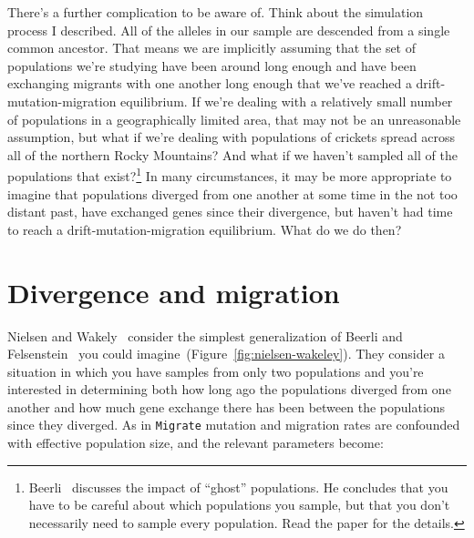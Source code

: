 There's a further complication to be aware of. Think about the
simulation process I described. All of the alleles in our sample are
descended from a single common ancestor. That means we are implicitly
assuming that the set of populations we're studying have been around
long enough and have been exchanging migrants with one another long
enough that we've reached a drift-mutation-migration equilibrium. If
we're dealing with a relatively small number of populations in a
geographically limited area, that may not be an unreasonable
assumption, but what if we're dealing with populations of crickets
spread across all of the northern Rocky Mountains? And what if we
haven't sampled all of the populations that
exist?\footnote{Beerli~\cite{Beerli-2004} discusses the impact of
  ``ghost'' populations. He concludes that you have to be careful
  about which populations you sample, but that you don't necessarily
  need to sample every population. Read the paper for the details.} In
many circumstances, it may be more appropriate to imagine that
populations diverged from one another at some time in the not too
distant past, have exchanged genes since their divergence, but haven't
had time to reach a drift-mutation-migration equilibrium. What do we
do then?

\section*{Divergence and migration}

Nielsen and Wakely~\cite{Nielsen-Wakeley-2001} consider the simplest
generalization of Beerli and
Felsenstein~\cite{Beerli-Felsenstein-1999,Beerli-Felsenstein-2001} you
could imagine~(Figure~\ref{fig:nielsen-wakeley}). They consider a
situation in which you have samples from only two populations and
you're interested in determining both how long ago the populations
diverged from one another and how much gene exchange there has been
between the populations since they diverged. As in {\tt Migrate}
mutation and migration rates are confounded with effective population
size, and the relevant parameters become:

